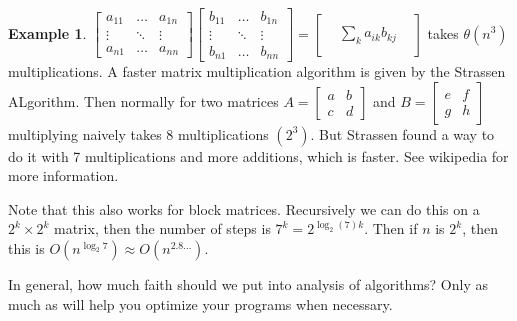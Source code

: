 \documentclass[12pt,letterpaper]{article}
\theoremstyle{definition}
\newtheorem{example}{Example}[section]
\begin{document}
\begin{example}
	$\begin{bmatrix}
		a_{11} & \dots & a_{1n}\\
		\vdots & \ddots & \vdots\\
		a_{n1} & \dots & a_{nn}
	\end{bmatrix}\begin{bmatrix}
		b_{11} & \dots & b_{1n}\\
		\vdots & \ddots & \vdots\\
		b_{n1} & \dots & b_{nn}
	\end{bmatrix} = \begin{bmatrix}
	& & \\
	& \sum_{k} a_{ik}b_{kj} & \\
	& & 
	\end{bmatrix}$ takes $\theta(n^3)$ multiplications. A faster matrix multiplication algorithm is given by the Strassen ALgorithm. Then normally for two matrices $A = \begin{bmatrix}
	a & b\\
	c & d
	\end{bmatrix}$ and $B = \begin{bmatrix}
	e & f\\
	g & h
	\end{bmatrix}$ multiplying naively takes 8 multiplications $(2^3)$. But Strassen found a way to do it with 7 multiplications and more additions, which is faster. See wikipedia for more information. 
	
	Note that this also works for block matrices. Recursively we can do this on a $2^k \times 2^k$ matrix, then the number of steps is $7^k = 2^{\log_2(7)k}$. Then if $n$ is $2^k$, then this is $O(n^{\log_2 7}) \approx O(n^{2.8\ldots})$.  
\end{example}

In general, how much faith should we put into analysis of algorithms? Only as much as will help you optimize your programs when necessary. 
\end{document}

